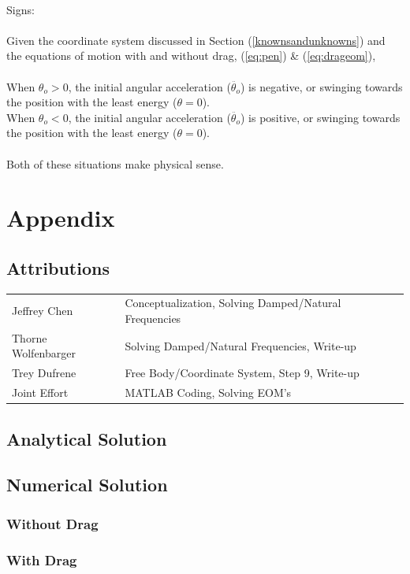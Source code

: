 \documentclass[12pt]{report}
\begin{document}
\begin{flushleft}
~\\
Signs: \\
~\\
Given the coordinate system discussed in Section (\ref{knownsandunknowns}) and the
equations of motion with and without drag, (\ref{eq:pen}) \& (\ref{eq:drageom}), \\
~\\
When $\theta_o > 0$, the initial angular acceleration ($\ddot{\theta_o}$) is negative,
or swinging towards the position with the least energy ($\theta = 0$). \\
When $\theta_o < 0$, the initial angular acceleration ($\ddot{\theta_o}$) is positive,
or swinging towards the position with the least energy ($\theta = 0$). \\
~\\
Both of these situations make physical sense.
\newpage
\section{Appendix} \label{appendix}

\subsection{Attributions}

\onehalfspacing
\begin{tabular}{ll}
Jeffrey Chen & Conceptualization, Solving Damped/Natural Frequencies\\
Thorne Wolfenbarger & Solving Damped/Natural Frequencies, Write-up\\
Trey Dufrene & Free Body/Coordinate System, Step 9, Write-up\\
Joint Effort & MATLAB Coding, Solving EOM's
\end{tabular}
\singlespacing

\subsection{Analytical Solution}

\newpage

\subsection{Numerical Solution} \label{appendix:numerical}
\subsubsection{Without Drag}

\newpage
\subsubsection{With Drag}


\end{flushleft}
\end{document}
